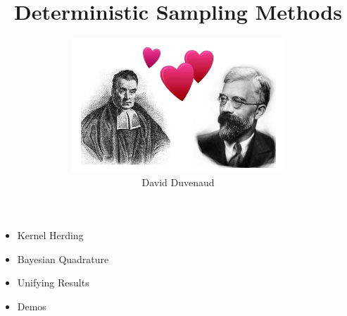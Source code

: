 \documentclass[usenames,dvipsnames]{beamer}
\begin{document}




\title{\textbf{Deterministic Sampling Methods}}
\author{\includegraphics[width=0.6\textwidth]{figures/fisherbayes/lovers2}
\\David Duvenaud} 
 

\begin{frame}
	\titlepage
\end{frame}





\begin{frame}[plain, t]
	\bodyheaderskip
	\slidebody
	{
		\begin{itemize}
			\item Kernel Herding
			\item Bayesian Quadrature			
			\item Unifying Results
			\item Demos
		\end{itemize}
	}
\end{frame}
\end{document}
